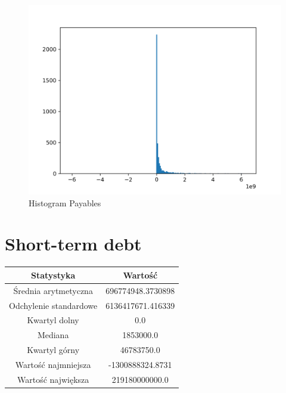 \documentclass{article}
\begin{document}
\begin{figure}[h!]
    \includegraphics[width=\linewidth]{variables/Payables.png}
    \caption{Histogram Payables }
\end{figure}\section{ Short-term debt }

\begin{center}
    \begin{tabular}{|c | c|} 
    \hline
    Statystyka & Wartość \\
    \hline\hline
    Średnia arytmetyczna & 696774948.3730898 \\ 
    \hline
    Odchylenie standardowe & 6136417671.416339 \\
    \hline
    Kwartyl dolny & 0.0 \\
    \hline
    Mediana & 1853000.0 \\
    \hline
    Kwartyl górny & 46783750.0 \\
    \hline
    Wartość najmniejsza & -1300888324.8731 \\
    \hline
    Wartość największa & 219180000000.0 \\
    \hline
   \end{tabular}
\end{center}
\end{document}
